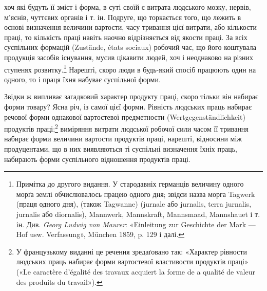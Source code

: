 \parcont{}  %
хоч які будуть її зміст і форма, в суті своїй є витрата людського
мозку, нервів, м’яснів, чуттєвих органів і т. ін. Подруге, що торкається
того, що лежить в основі визначення величини вартости,
часу тривання цієї витрати, або кількости праці, то кількість
праці навіть наочно відрізняється від якости праці. За всіх суспільних
формацій (Zustände, états sociaux) робочий час, що його
коштувала продукція засобів існування, мусив цікавити людей,
хоч і неоднаково на різних ступенях розвитку.\footnote{
Примітка до другого видання. У стародавніх германців величину
одного морґа землі обчислювалось працею одного дня; звідси назва морга
Tagwerk (праця одного дня), (також Tagwanne) (jurnale або jurnalis,
terra jurnalis, jurnalis або diornalis), Mannwerk, Mannskraft, Mannsmaad,
Mannshauet і т. ін. Див. \emph{Georg Ludwig von Maurer}: «Einleitung zur Geschichte
der Mark — Hof usw. Verfassung», München 1859, p. 129 і далі.
} Нарешті, скоро
люди в будь-який спосіб працюють один на одного, то і праця
їхня набуває суспільної форми.

Звідки ж випливає загадковий характер продукту праці,
скоро тільки він набирає форми товару? Ясна річ, із самої цієї
форми. Рівність людських праць набирає речової форми однакової
вартостевої предметности (Wertgegenständlichkeit) продуктів
праці;\footnote*{
У французькому виданні це речення зредаґовано так: «Характер
рівности людських праць набирає форми вартостевої властивости продуктів
праці» («Le caractère d’égalité des travaux acquiert la forme de
a qualité de valeur des produits du travail»).
} виміряння витрати людської робочої сили часом її тривання
набирає форми величини вартости продуктів праці, нарешті,
відносини між продуцентами, що в них виявляються ті
суспільні визначення їхніх праць, набирають форми суспільного
відношення продуктів праці.

